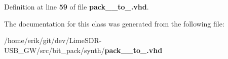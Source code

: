 Definition at line {\bf 59} of file {\bf pack\+\_\+\_\+to\+\_.\+vhd}.



The documentation for this class was generated from the following file\+:\begin{DoxyCompactItemize}
\item 
/home/erik/git/dev/\+Lime\+S\+D\+R-\/\+U\+S\+B\+\_\+\+G\+W/src/bit\+\_\+pack/synth/{\bf pack\+\_\+\_\+to\+\_.\+vhd}\end{DoxyCompactItemize}
